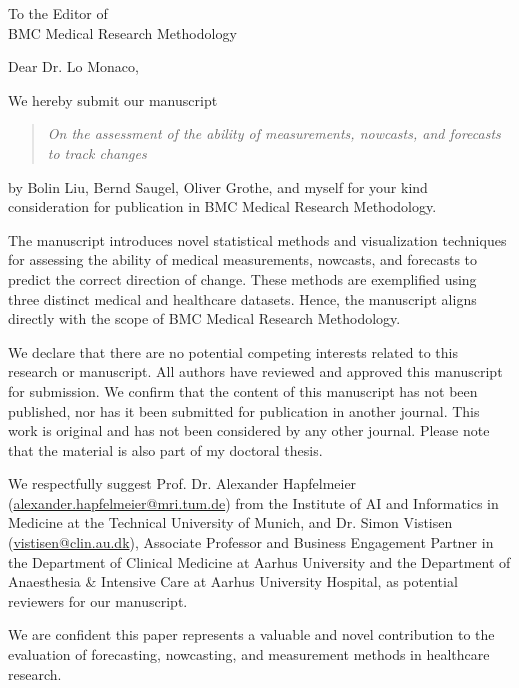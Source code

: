 \documentclass[%
 KITletter, %
fromemail,fromurl, %
 USenglish,%
  backaddress=off,
foldmarks=off,
 ]{scrlttr2}
\begin{document}

\def\pagename{} %

\begin{letter}{%
To the Editor of \\ BMC Medical Research Methodology
}

\opening{Dear Dr. Lo Monaco,}

We hereby submit our manuscript

\begin{quote}
\textit{On the assessment of the ability of measurements, nowcasts, and forecasts to track changes}
\end{quote}

by Bolin Liu, Bernd Saugel, Oliver Grothe, and myself for your kind consideration for publication in BMC Medical Research Methodology.

The manuscript introduces novel statistical methods and visualization techniques for assessing the ability of medical measurements, nowcasts, and forecasts to predict the correct direction of change.
These methods are exemplified using three distinct medical and healthcare datasets.
Hence, the manuscript aligns directly with the scope of BMC Medical Research Methodology.

We declare that there are no potential competing interests related to this research or manuscript.
All authors have reviewed and approved this manuscript for submission.
We confirm that the content of this manuscript has not been published, nor has it been submitted for publication in another journal.
This work is original and has not been considered by any other journal.
Please note that the material is also part of my doctoral thesis.

We respectfully suggest Prof. Dr. Alexander Hapfelmeier (\url{alexander.hapfelmeier@mri.tum.de}) from the Institute of AI and Informatics in Medicine at the Technical University of Munich, and Dr. Simon Vistisen (\url{vistisen@clin.au.dk}), Associate Professor and Business Engagement Partner in the Department of Clinical Medicine at Aarhus University and the Department of Anaesthesia \& Intensive Care at Aarhus University Hospital, as potential reviewers for our manuscript.

We are confident this paper represents a valuable and novel contribution to the evaluation of forecasting, nowcasting, and measurement methods in healthcare research.


\closing{}

\end{letter}
\end{document}
